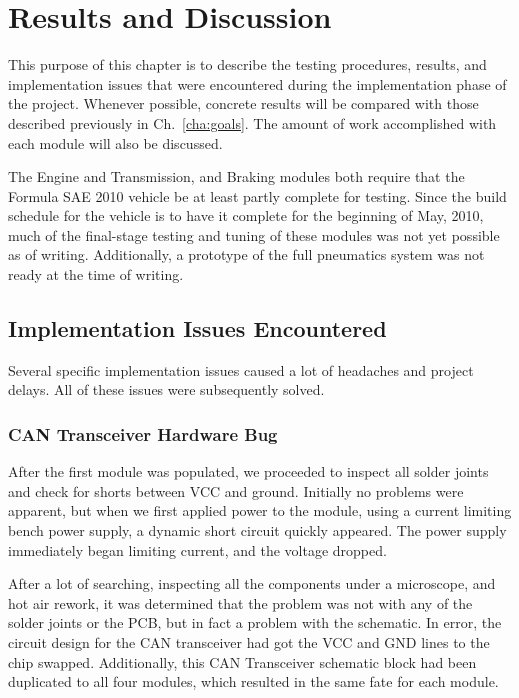 \chapter{Results and Discussion}
\label{cha:results}

This purpose of this chapter is to describe the testing procedures, results, and implementation issues that were encountered during the implementation phase of the project. Whenever possible, concrete results will be compared with those described previously in Ch.\ \ref{cha:goals}. The amount of work accomplished with each module will also be discussed.

The Engine and Transmission, and Braking modules both require that the Formula SAE 2010 vehicle be at least partly complete for testing. Since the build schedule for the vehicle is to have it complete for the beginning of May, 2010, much of the final-stage testing and tuning of these modules was not yet possible as of writing. Additionally, a prototype of the full pneumatics system was not ready at the time of writing.









\section{Implementation Issues Encountered}

Several specific implementation issues caused a lot of headaches and project delays. All of these issues were subsequently solved.

\subsection{CAN Transceiver Hardware Bug}

After the first module was populated, we proceeded to inspect all solder joints and check for shorts between VCC and ground. Initially no problems were apparent, but when we first applied power to the module, using a current limiting bench power supply, a dynamic short circuit quickly appeared. The power supply immediately began limiting current, and the voltage dropped.

After a lot of searching, inspecting all the components under a microscope, and hot air rework, it was determined that the problem was not with any of the solder joints or the PCB, but in fact a problem with the schematic. In error, the circuit design for the CAN transceiver had got the VCC and GND lines to the chip swapped. Additionally, this CAN Transceiver schematic block had been duplicated to all four modules, which resulted in the same fate for each module.

